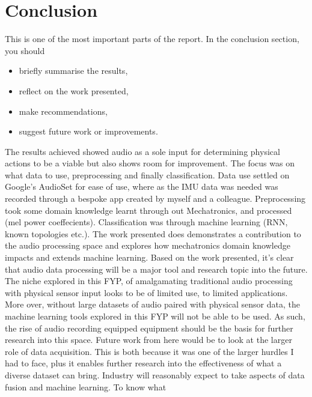\documentclass{UoNMCHA}
\numberwithin{equation}{section}
\begin{document}
\section{Conclusion}\label{sec:Conclusion}
This is one of the most important parts of the report. In the conclusion section, you  should 
\begin{itemize}
\item briefly summarise the results,
\item reflect on the work presented, 
\item make recommendations,
\item suggest future work or improvements.
\end{itemize}

The results achieved showed audio as a sole input for determining physical actions to be a viable but also shows room for improvement. The focus was on what data to use, preprocessing and finally classification. 
Data use settled on Google's AudioSet for ease of use, where as the IMU data was needed was recorded through a bespoke app created by myself and a colleague. Preprocessing took some domain knowledge learnt through out Mechatronics, and processed (mel power coeffecients). Classification was through machine learning (RNN, known topologies etc.). 
The work presented does demonstrates a contribution to the audio processing space and explores how mechatronics domain knowledge impacts and extends machine learning.
Based on the work presented, it's clear that audio data processing will be a major tool and research topic into the future. The niche explored in this FYP, of amalgamating traditional audio processing with physical sensor input looks to be of limited use, to limited applications. More over, without large datasets of audio paired with physical sensor data, the machine learning tools explored in this FYP will not be able to be used. As such, the rise of audio recording equipped equipment should be the basis for further research into this space. 
Future work from here would be to look at the larger role of data acquisition. This is both because it was one of the larger hurdles I had to face, plus it enables further research into the effectiveness of what a diverse dataset can bring. Industry will reasonably expect to take aspects of data fusion and machine learning. To know what
\end{document}

